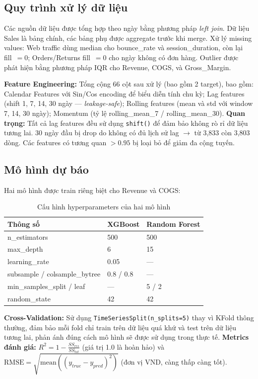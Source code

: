 \documentclass{article}
\begin{document}
\subsection{Quy trình xử lý dữ liệu}

Các nguồn dữ liệu được tổng hợp theo ngày bằng phương pháp \textit{left join}. Dữ liệu Sales là bảng chính, các bảng phụ được aggregate trước khi merge. Xử lý missing values: Web traffic dùng median cho bounce\_rate và session\_duration, còn lại fill~$= 0$; Orders/Returns fill~$= 0$ cho ngày không có đơn hàng. Outlier được phát hiện bằng phương pháp IQR cho Revenue, COGS, và Gross\_Margin.

\textbf{Feature Engineering:} Tổng cộng 66 cột sau xử lý (bao gồm 2 target), bao gồm: Calendar Features với Sin/Cos encoding để biểu diễn tính chu kỳ; Lag features (shift 1, 7, 14, 30 ngày --- \textit{leakage-safe}); Rolling features (mean và std với window 7, 14, 30 ngày); Momentum (tỷ lệ rolling\_mean\_7 / rolling\_mean\_30). \textbf{Quan trọng:} Tất cả lag features đều sử dụng \texttt{shift()} để đảm bảo không rò rỉ dữ liệu tương lai. 30 ngày đầu bị drop do không có đủ lịch sử lag $\to$ từ 3{,}833 còn 3{,}803 dòng. Các features có tương quan $> 0.95$ bị loại bỏ để giảm đa cộng tuyến.

\subsection{Mô hình dự báo}

Hai mô hình được train riêng biệt cho Revenue và COGS:

\begin{table}[H]
  \caption{Cấu hình hyperparameters của hai mô hình}
  \label{tab:hyperparams}
  \centering
  \begin{tabular}{lll}
    \toprule
    Thông số & XGBoost & Random Forest \\
    \midrule
    n\_estimators & 500 & 500 \\
    max\_depth & 6 & 15 \\
    learning\_rate & 0.05 & --- \\
    subsample / colsample\_bytree & 0.8 / 0.8 & --- \\
    min\_samples\_split / leaf & --- & 5 / 2 \\
    random\_state & 42 & 42 \\
    \bottomrule
  \end{tabular}
\end{table}

\textbf{Cross-Validation:} Sử dụng \texttt{TimeSeriesSplit(n\_splits=5)} thay vì KFold thông thường, đảm bảo mỗi fold chỉ train trên dữ liệu quá khứ và test trên dữ liệu tương lai, phản ánh đúng cách mô hình sẽ được sử dụng trong thực tế. \textbf{Metrics đánh giá:} $R^2 = 1 - \frac{SS_{res}}{SS_{tot}}$ (giá trị 1.0 là hoàn hảo) và $\text{RMSE} = \sqrt{\text{mean}((y_{true} - y_{pred})^2)}$ (đơn vị VND, càng thấp càng tốt).
\end{document}
